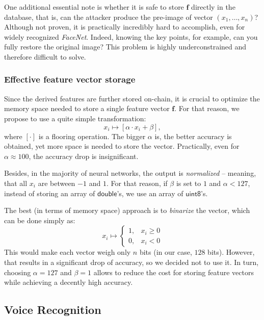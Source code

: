 \documentclass[a4, 14pt]{extarticle}
\begin{document}
One additional essential note is whether it is safe to store $\boldsymbol{f}$ directly in the database, that is, can the attacker produce the pre-image of vector $(x_1,\dots,x_n)$? Although not proven, it is practically incredibly hard to accomplish, even for widely recognized \textit{FaceNet}. Indeed, knowing the key points, for example, can you fully restore the original image? This problem is highly underconstrained and therefore difficult to solve. 

\subsubsection{Effective feature vector storage}
Since the derived features are further stored on-chain, it is crucial to optimize the memory space needed to store a single feature vector $\boldsymbol{f}$. For that reason, we propose to use a quite simple transformation:
\begin{equation}
    x_i \mapsto [\alpha \cdot x_i + \beta],
\end{equation}
where $[\cdot]$ is a flooring operation. The bigger $\alpha$ is, the better accuracy is obtained, yet more space is needed to store the vector. Practically, even for $\alpha \approx 100$, the accuracy drop is insignificant. 

Besides, in the majority of neural networks, the output is \textit{normalized} -- meaning, that all $x_i$ are between $-1$ and $1$. For that reason, if $\beta$ is set to $1$ and $\alpha < 127$, instead of storing an array of $\mathsf{double}$'s, we use an array of $\mathsf{uint8}$'s. 

The best (in terms of memory space) approach is to \textit{binarize} the vector, which can be done simply as:
\begin{equation}
    x_i \mapsto \begin{cases}
        1, & x_i \geq 0 \\
        0, & x_i < 0
    \end{cases}
\end{equation}
This would make each vector weigh only $n$ bits (in our case, $128$ bits). However, that results in a significant drop of accuracy, so we decided not to use it. In turn, choosing $\alpha=127$ and $\beta=1$ allows to reduce the cost for storing feature vectors while achieving a decently high accuracy.


\subsection{Voice Recognition}\label{ai:voice}
\end{document}
